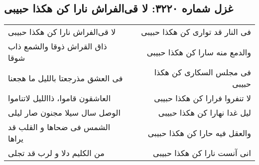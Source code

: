 \begin{center}
\section*{غزل شماره ۳۲۲۰: لا قی‌الفراش نارا کن هکذا حبیبی}
\label{sec:3220}
\begin{longtable}{l p{0.5cm} r}
لا قی‌الفراش نارا کن هکذا حبیبی
&&
فی النار قد تواری کن هکذا حبیبی
\\
ذاق القراش ذوقا والشمع ذاب شوقا
&&
والدمع منه سارا کن هکذا حبیبی
\\
فی العشق مذرجعتا باللیل ما هجعنا
&&
فی مجلس السکاری کن هکذا حبیبی
\\
العاشقون قاموا، ذااللیل لاتناموا
&&
لا تنفروا فرارا کن هکذا حبیبی
\\
الوصل سال سیلا مجنون صار لیلی
&&
لیل غدا نهارا کن هکذا حبیبی
\\
الشمس فی ضحاها و القلب قد یراها
&&
والعقل فیه حارا کن هکذا حبیبی
\\
من الکلیم دلا و لرب قد تجلی
&&
انی آنست نارا کن هکذا حبیبی
\\
\end{longtable}
\end{center}
